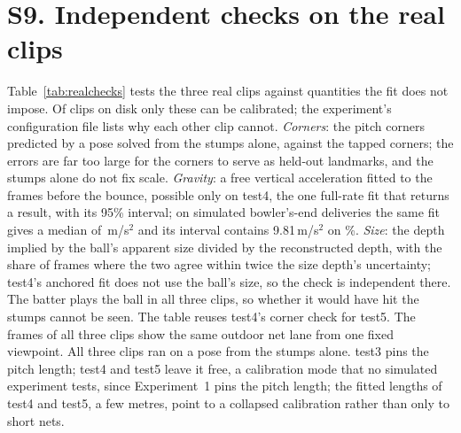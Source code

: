 \documentclass[journal]{IEEEtran}
\begin{document}
\begin{table}[t]
\centering
\caption{Sensitivity of the simulated crossing and verdict to calibration tap error. $\Delta$: change from
the unperturbed taps, in mm. Flips: verdicts that change, with their share of deliveries.}
\label{tab:taps}
\scriptsize
\setlength{\tabcolsep}{3pt}
\resizebox{\textwidth}{!}{}
\end{table}

\section*{S9. Independent checks on the real clips}

Table~\ref{tab:realchecks} tests the three real clips against quantities the fit does not impose. Of
\RealClipsFound{} clips on disk only these \RealClipsUsed{} can be calibrated; the experiment's
configuration file lists why each other clip cannot. \emph{Corners}: the pitch corners predicted by a pose
solved from the stumps alone, against the tapped corners; the errors are far too large for the corners to
serve as held-out landmarks, and the stumps alone do not fix scale. \emph{Gravity}: a free vertical
acceleration fitted to the frames before the bounce, possible only on test4, the one full-rate fit that
returns a result, with its 95\% interval; on \SimGravN{} simulated bowler's-end deliveries the same fit gives a median of
\SimGravMed\,m/s$^2$ and its interval contains 9.81\,m/s$^2$ on \SimGravCoverPct\%. \emph{Size}: the depth implied by the ball's
apparent size divided by the reconstructed depth, with the share of frames where the two agree within twice
the size depth's uncertainty; test4's anchored fit does not use the ball's size, so the check is
independent there. The batter plays the ball in all three clips, so whether it would have hit the stumps cannot
be seen. The table reuses test4's corner check for test5. The frames of all three clips show the same outdoor net lane from one fixed viewpoint.
All three clips ran on a pose from the stumps alone. test3 pins the pitch length; test4 and test5 leave it
free, a calibration mode that no simulated experiment tests, since Experiment~1 pins the pitch length; the fitted lengths of test4 and
test5, a few metres, point to a collapsed calibration rather than only to short nets.

\begin{table}[t]
\centering
\caption{Independent checks on the three real clips (test3 off-spin, test4 leg-spin, test5
off-spin, all on one outdoor net). Corner errors in mm; $g$ in m/s$^2$
with its 95\% interval; $2u$ is twice the size depth's standard uncertainty. --: the full-rate analysis is declined.}
\label{tab:realchecks}
\scriptsize
\resizebox{\textwidth}{!}{}
\end{table}
\end{document}
